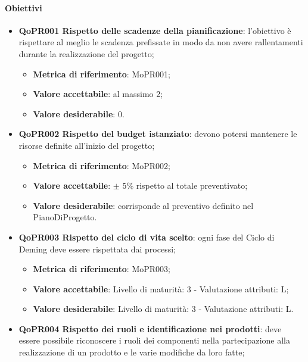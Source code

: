 \documentclass[../piano-di-qualifica.tex]{subfiles}
\begin{document}
\paragraph{Obiettivi}
\label{sub:obiettivi_1}
\begin{itemize}
    \item \textbf{QoPR001 Rispetto delle scadenze della pianificazione}: l'obiettivo è rispettare al meglio le scadenza prefissate in modo da non avere rallentamenti durante la realizzazione del progetto;
        \begin{itemize}
            \item \textbf{Metrica di riferimento}: MoPR001;
            \item \textbf{Valore accettabile}: al massimo 2; %
            \item \textbf{Valore desiderabile}: 0.
        \end{itemize}
    \item \textbf{QoPR002 Rispetto del budget istanziato}: devono potersi mantenere le risorse definite all'inizio del progetto;
        \begin{itemize}
            \item \textbf{Metrica di riferimento}: MoPR002;
            \item \textbf{Valore accettabile}: $\pm$ 5\% rispetto al totale preventivato; %
            \item \textbf{Valore desiderabile}: corrisponde al preventivo definito nel PianoDiProgetto.
        \end{itemize}
    \item \textbf{QoPR003 Rispetto del ciclo di vita scelto}: ogni fase del Ciclo di Deming deve essere rispettata dai processi;
        \begin{itemize}
            \item \textbf{Metrica di riferimento}: MoPR003;
            \item \textbf{Valore accettabile}: Livello di maturità: 3 - Valutazione attributi: L; %
            \item \textbf{Valore desiderabile}: Livello di maturità: 3 - Valutazione attributi: L.
        \end{itemize}
    \item \textbf{QoPR004 Rispetto dei ruoli e identificazione nei prodotti}: deve essere possibile riconoscere i ruoli dei componenti nella partecipazione alla realizzazione di un prodotto e le varie modifiche da loro fatte;

\end{itemize}
\end{document}
